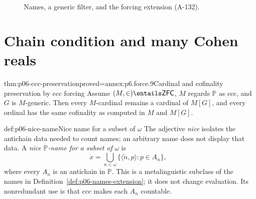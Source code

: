 \begin{figure}[htbp]
\centering
{}
\caption{Names, a generic filter, and the forcing extension (A-132).}
\label{fig:p06-forcing-extension}
\end{figure}

\section{Chain condition and many Cohen reals}
\label{sec:p06-ccc-cohen}

\begin{hbtheorem}{thm:p06-ccc-preservation}{proved=annex:p6.force.9}{Cardinal and cofinality preservation by ccc forcing}
Assume \((M,\in)\entails\mathsf{ZFC}\), \(M\) regards \(\mathbb P\) as ccc,
and \(G\) is \(M\)-generic.  Then every \(M\)-cardinal remains a cardinal of
\(M[G]\), and every ordinal has the same cofinality as computed in \(M\) and
\(M[G]\).
\end{hbtheorem}

\begin{hbdefinition}{def:p06-nice-name}{Nice name for a subset of \(\omega\)}
The adjective \emph{nice} isolates the antichain data needed to count names;
an arbitrary name does not display that data.  A \emph{nice
\(\mathbb P\)-name for a subset of \(\omega\)} is
\[
  \dot x=\bigcup_{n<\omega}
  \{\langle\check n,p\rangle:p\in A_n\},
\]
where every \(A_n\) is an antichain in \(\mathbb P\).  This is a
metalinguistic subclass of the names in
Definition~\ref{def:p06-names-extension}; it does not change evaluation.  Its
nonredundant use is that ccc makes each \(A_n\) countable.
\end{hbdefinition}

